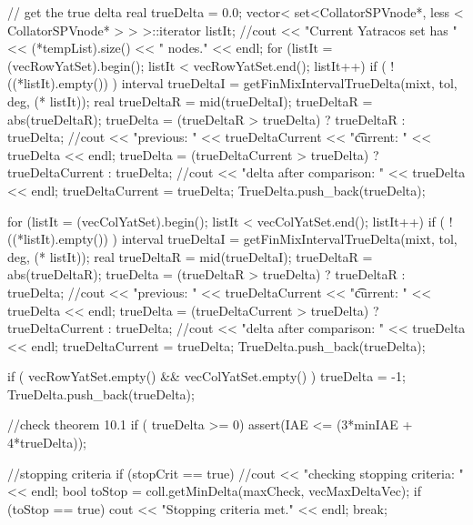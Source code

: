 \begin{DoxyCode}
{{{        // get the true delta
        real trueDelta = 0.0;
        vector< set<CollatorSPVnode*, less < CollatorSPVnode* > > >::iterator 
      listIt;   
        //cout << "Current Yatracos set has " << (*tempList).size() << "
       nodes." << endl;
        for (listIt = (vecRowYatSet).begin(); listIt < vecRowYatSet.end(); 
      listIt++) {
          if ( !((*listIt).empty()) ) {
            interval trueDeltaI = getFinMixIntervalTrueDelta(mixt, tol, deg, (*
      listIt));
            real trueDeltaR = mid(trueDeltaI);
            trueDeltaR = abs(trueDeltaR);
            trueDelta = (trueDeltaR > trueDelta) ? trueDeltaR : trueDelta;
            //cout << "previous: " << trueDeltaCurrent << "\t current: " <<
       trueDelta << endl;
            trueDelta = (trueDeltaCurrent > trueDelta) ? trueDeltaCurrent : 
      trueDelta;
            //cout << "delta after comparison: " << trueDelta << endl;
            trueDeltaCurrent = trueDelta;
            TrueDelta.push_back(trueDelta);
          }
        }
        
        for (listIt = (vecColYatSet).begin(); listIt < vecColYatSet.end(); 
      listIt++) {
          if ( !((*listIt).empty()) ) {
            interval trueDeltaI = getFinMixIntervalTrueDelta(mixt, tol, deg, (*
      listIt));
            real trueDeltaR = mid(trueDeltaI);
            trueDeltaR = abs(trueDeltaR);
            trueDelta = (trueDeltaR > trueDelta) ? trueDeltaR : trueDelta;
            //cout << "previous: " << trueDeltaCurrent << "\t current: " <<
       trueDelta << endl;
            trueDelta = (trueDeltaCurrent > trueDelta) ? trueDeltaCurrent : 
      trueDelta;
            //cout << "delta after comparison: " << trueDelta << endl;
            trueDeltaCurrent = trueDelta;
            TrueDelta.push_back(trueDelta);
          }
        }
        
        
        if ( vecRowYatSet.empty() && vecColYatSet.empty() ) 
        { trueDelta = -1; TrueDelta.push_back(trueDelta); } 
        
      //check theorem 10.1
      if ( trueDelta >= 0) {  assert(IAE <= (3*minIAE + 4*trueDelta)); }

        //stopping criteria
        if (stopCrit == true) {
          //cout << "checking stopping criteria: " << endl;
          bool toStop = coll.getMinDelta(maxCheck, vecMaxDeltaVec);
          if (toStop == true) {
            cout << "Stopping criteria met." << endl;
            break;
          } 
        }

}}}
\end{DoxyCode}
